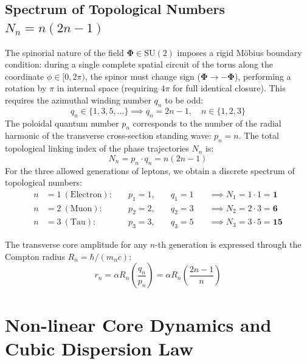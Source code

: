 \documentclass[12pt,a4paper]{article}
\begin{document}
	\subsection{Spectrum of Topological Numbers $N_n = n(2n-1)$}
	The spinorial nature of the field $\boldsymbol{\Phi} \in \mathrm{SU}(2)$ imposes a rigid Möbius boundary condition: during a single complete spatial circuit of the torus along the coordinate $\phi \in [0, 2\pi)$, the spinor must change sign ($\boldsymbol{\Phi} \to -\boldsymbol{\Phi}$), performing a rotation by $\pi$ in internal space (requiring $4\pi$ for full identical closure). 
	This requires the azimuthal winding number $q_n$ to be odd:
	\begin{equation}
		q_n \in \{1, 3, 5, \dots\} \implies q_n = 2n - 1, \quad n \in \{1, 2, 3\}
	\end{equation}
	The poloidal quantum number $p_n$ corresponds to the number of the radial harmonic of the transverse cross-section standing wave: $p_n = n$.
	The total topological linking index of the phase trajectories $N_n$ is:
	\begin{equation}
		N_n = p_n \cdot q_n = n(2n - 1)
	\end{equation}
	For the three allowed generations of leptons, we obtain a discrete spectrum of topological numbers:
	\begin{align}
		n &= 1 \ (\text{Electron}): \quad &p_1 = 1, \quad &q_1 = 1 \quad &\implies N_1 = 1 \cdot 1 = \mathbf{1} \\
		n &= 2 \ (\text{Muon}):     \quad &p_2 = 2, \quad &q_2 = 3 \quad &\implies N_2 = 2 \cdot 3 = \mathbf{6} \\
		n &= 3 \ (\text{Tau}):      \quad &p_3 = 3, \quad &q_3 = 5 \quad &\implies N_3 = 3 \cdot 5 = \mathbf{15}
	\end{align}
	
	The transverse core amplitude for any $n$-th generation is expressed through the Compton radius $R_n = \hbar / (m_n c)$:
	\begin{equation}
		r_n = \alpha R_n \left( \frac{q_n}{p_n} \right) = \alpha R_n \left( \frac{2n-1}{n} \right)
	\end{equation}
	
	\section{Non-linear Core Dynamics and Cubic Dispersion Law}
	
\end{document}
